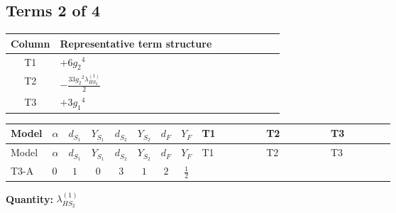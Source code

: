 \documentclass[8pt]{article}
\begin{document}
\begin{landscape}
\subsection*{Terms 2 of 4}
\begin{center}
\begin{tabular}{@{}c >{\raggedright\arraybackslash}p{0.82\linewidth}@{}}
\toprule
Column & Representative term structure \\
\midrule
T1 & \(\displaystyle +6 {g_2}^4\) \\
\midrule
T2 & \(\displaystyle -\frac{33 {g_2}^2 {\lambda_{HS_2}^{(1)}}}{2}\) \\
\midrule
T3 & \(\displaystyle +3 {g_1}^4\) \\
\midrule
\bottomrule
\end{tabular}
\end{center}
\smallskip
\tiny
\begin{longtable}{@{}llcccccc >{\raggedright\arraybackslash}p{0.21\linewidth} >{\raggedright\arraybackslash}p{0.21\linewidth} >{\raggedright\arraybackslash}p{0.21\linewidth}@{}}
\toprule
Model & $\alpha$ & $d_{S_1}$ & $Y_{S_1}$ & $d_{S_2}$ & $Y_{S_2}$ & $d_F$ & $Y_F$ & T1 & T2 & T3 \\
\midrule
\endfirsthead
\toprule
Model & $\alpha$ & $d_{S_1}$ & $Y_{S_1}$ & $d_{S_2}$ & $Y_{S_2}$ & $d_F$ & $Y_F$ & T1 & T2 & T3 \\
\midrule
\endhead
T3-A & $0$ & $1$ & $0$ & $3$ & $1$ & $2$ & $\frac{1}{2}$ & \scriptsize\adjustbox{max width=\linewidth}{$\begin{gathered} +6 {g_2}^4\end{gathered}$} & \scriptsize\adjustbox{max width=\linewidth}{$\begin{gathered} -\frac{33 {g_2}^2 {\lambda_{HS_2}^{(1)}}}{2}\end{gathered}$} & \scriptsize\adjustbox{max width=\linewidth}{$\begin{gathered} +3 {g_1}^4\end{gathered}$} \\
\midrule
\bottomrule
\end{longtable}
\clearpage
\noindent\textbf{Quantity: }$\lambda_{HS_2}^{(1)}$\par\smallskip

\end{landscape}
\end{document}
